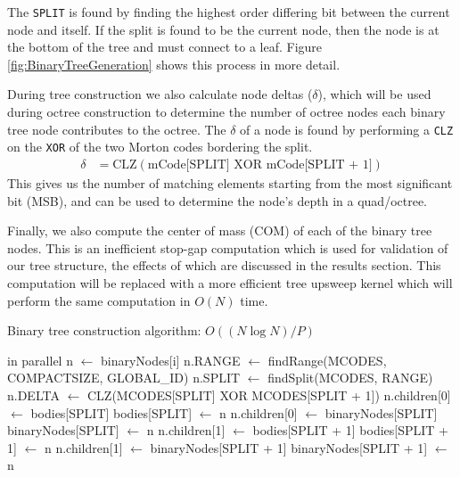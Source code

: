 \documentclass{thesis}
\begin{document}
The \texttt{SPLIT} is found by finding the highest order differing bit between the current node and itself. If the split is found to be the current node, then the node is at the bottom of the tree and must connect to a leaf. Figure \ref{fig:BinaryTreeGeneration} shows this process in more detail.

During tree construction we also calculate node deltas ($\delta$), which will be used during octree construction to determine the number of octree nodes each binary tree node contributes to the octree. The $\delta$ of a node is found by performing a \texttt{CLZ} on the \texttt{XOR} of the two  Morton codes bordering the split.
\begin{align}
    \delta &= \text{CLZ}(\text{mCode[SPLIT]} \text{ XOR } \text{mCode[SPLIT + 1]})
\end{align}
This gives us the number of matching elements starting from the most significant bit (MSB), and can be used to determine the node's depth in a quad/octree.

Finally, we also compute the center of mass (COM) of each of the binary tree nodes. This is an inefficient stop-gap computation which is used for validation of our tree structure, the effects of which are discussed in the results section. This computation will be replaced with a more efficient tree upsweep kernel which will perform the same computation in $O(N)$ time.

\begin{algorithm}
    \label{alg:BinaryTreeConstruction}
    \caption{Binary tree construction algorithm: $O((N \log N) / P)$}
    \begin{algorithmic}
         in parallel
            \State n $\gets$ binaryNodes[i]
            \State n.RANGE $\gets$ findRange(MCODES, COMPACTSIZE, GLOBAL\_ID)
            \State n.SPLIT $\gets$ findSplit(MCODES, RANGE)
            \State n.DELTA $\gets$ CLZ(MCODES[SPLIT] XOR MCODES[SPLIT + 1])
                \State n.children[0] $\gets$ bodies[SPLIT]
                \State bodies[SPLIT] $\gets$ n
            \Else
                \State n.children[0] $\gets$ binaryNodes[SPLIT]
                \State binaryNodes[SPLIT] $\gets$ n
            \EndIf
                \State n.children[1] $\gets$ bodies[SPLIT + 1]
                \State bodies[SPLIT + 1] $\gets$ n
            \Else
                \State n.children[1] $\gets$ binaryNodes[SPLIT + 1]
                \State binaryNodes[SPLIT + 1] $\gets$ n
            \EndIf
        \EndFor
    \end{algorithmic}
\end{algorithm}
\end{document}
